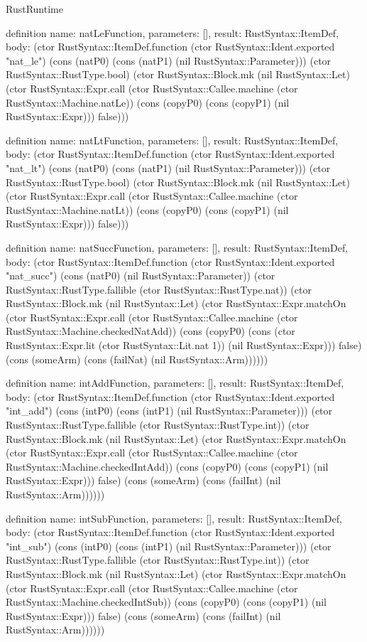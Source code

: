 \begin{lexlean}{RustRuntime}
\begin{semanticmodule}
definition{
  name: natLeFunction,
  parameters: [],
  result: RustSyntax::ItemDef,
  body: (ctor RustSyntax::ItemDef.function (ctor RustSyntax::Ident.exported "nat_le") (cons (natP0) (cons (natP1) (nil RustSyntax::Parameter))) (ctor RustSyntax::RustType.bool) (ctor RustSyntax::Block.mk (nil RustSyntax::Let) (ctor RustSyntax::Expr.call (ctor RustSyntax::Callee.machine (ctor RustSyntax::Machine.natLe)) (cons (copyP0) (cons (copyP1) (nil RustSyntax::Expr))) false)))
}

definition{
  name: natLtFunction,
  parameters: [],
  result: RustSyntax::ItemDef,
  body: (ctor RustSyntax::ItemDef.function (ctor RustSyntax::Ident.exported "nat_lt") (cons (natP0) (cons (natP1) (nil RustSyntax::Parameter))) (ctor RustSyntax::RustType.bool) (ctor RustSyntax::Block.mk (nil RustSyntax::Let) (ctor RustSyntax::Expr.call (ctor RustSyntax::Callee.machine (ctor RustSyntax::Machine.natLt)) (cons (copyP0) (cons (copyP1) (nil RustSyntax::Expr))) false)))
}

definition{
  name: natSuccFunction,
  parameters: [],
  result: RustSyntax::ItemDef,
  body: (ctor RustSyntax::ItemDef.function (ctor RustSyntax::Ident.exported "nat_succ") (cons (natP0) (nil RustSyntax::Parameter)) (ctor RustSyntax::RustType.fallible (ctor RustSyntax::RustType.nat)) (ctor RustSyntax::Block.mk (nil RustSyntax::Let) (ctor RustSyntax::Expr.matchOn (ctor RustSyntax::Expr.call (ctor RustSyntax::Callee.machine (ctor RustSyntax::Machine.checkedNatAdd)) (cons (copyP0) (cons (ctor RustSyntax::Expr.lit (ctor RustSyntax::Lit.nat 1)) (nil RustSyntax::Expr))) false) (cons (someArm) (cons (failNat) (nil RustSyntax::Arm))))))
}

definition{
  name: intAddFunction,
  parameters: [],
  result: RustSyntax::ItemDef,
  body: (ctor RustSyntax::ItemDef.function (ctor RustSyntax::Ident.exported "int_add") (cons (intP0) (cons (intP1) (nil RustSyntax::Parameter))) (ctor RustSyntax::RustType.fallible (ctor RustSyntax::RustType.int)) (ctor RustSyntax::Block.mk (nil RustSyntax::Let) (ctor RustSyntax::Expr.matchOn (ctor RustSyntax::Expr.call (ctor RustSyntax::Callee.machine (ctor RustSyntax::Machine.checkedIntAdd)) (cons (copyP0) (cons (copyP1) (nil RustSyntax::Expr))) false) (cons (someArm) (cons (failInt) (nil RustSyntax::Arm))))))
}

definition{
  name: intSubFunction,
  parameters: [],
  result: RustSyntax::ItemDef,
  body: (ctor RustSyntax::ItemDef.function (ctor RustSyntax::Ident.exported "int_sub") (cons (intP0) (cons (intP1) (nil RustSyntax::Parameter))) (ctor RustSyntax::RustType.fallible (ctor RustSyntax::RustType.int)) (ctor RustSyntax::Block.mk (nil RustSyntax::Let) (ctor RustSyntax::Expr.matchOn (ctor RustSyntax::Expr.call (ctor RustSyntax::Callee.machine (ctor RustSyntax::Machine.checkedIntSub)) (cons (copyP0) (cons (copyP1) (nil RustSyntax::Expr))) false) (cons (someArm) (cons (failInt) (nil RustSyntax::Arm))))))
}


\end{semanticmodule}
\end{lexlean}
